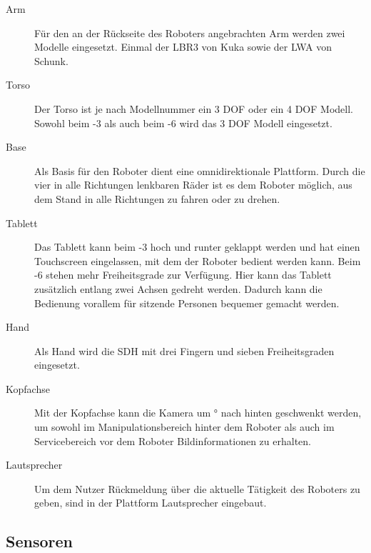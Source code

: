 \begin{description}
  \item[Arm] Für den an der Rückseite des Roboters
    angebrachten Arm werden zwei Modelle eingesetzt. Einmal der \ac{LBR3} von
    Kuka sowie der \ac{LWA} von Schunk. 
  \item[Torso] Der Torso ist je nach
    Modellnummer ein 3 \ac{DOF} oder ein 4 \ac{DOF} Modell. Sowohl beim -3 als auch beim -6 wird das 3 \ac{DOF} Modell eingesetzt.
  \item[Base] Als Basis für den Roboter dient eine omnidirektionale Plattform.
    Durch die vier in alle Richtungen lenkbaren Räder ist es dem Roboter möglich,
    aus dem Stand in alle Richtungen zu fahren oder zu drehen.
  \item[Tablett] Das Tablett kann beim -3 hoch und runter geklappt werden
    und hat einen Touchscreen eingelassen, mit dem der Roboter bedient werden
    kann. Beim -6 stehen mehr Freiheitsgrade zur Verfügung. Hier kann das
    Tablett zusätzlich entlang zwei Achsen gedreht werden. Dadurch kann die
    Bedienung vorallem für sitzende Personen bequemer gemacht werden. 
  \item[Hand]
    Als Hand wird die \ac{SDH} mit drei Fingern und sieben Freiheitsgraden
    eingesetzt. 
  \item[Kopfachse] Mit der Kopfachse kann die Kamera um \unit[180]{°} nach
    hinten geschwenkt werden, um sowohl im Manipulationsbereich hinter dem 
    Roboter als auch im Servicebereich vor dem Roboter Bildinformationen zu
    erhalten. 
  \item[Lautsprecher] Um dem
    Nutzer Rückmeldung über die aktuelle Tätigkeit des Roboters zu geben, sind in
    der Plattform Lautsprecher eingebaut.

\end{description}

\subsection{Sensoren}

